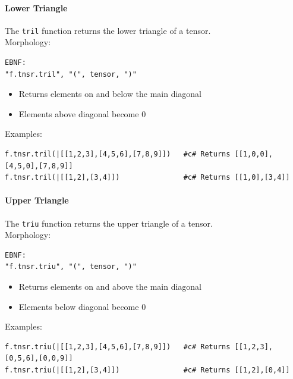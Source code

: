 \paragraph{Lower Triangle}
The \texttt{tril} function returns the lower triangle of a tensor.\\
Morphology:
\begin{verbatim}
EBNF:
"f.tnsr.tril", "(", tensor, ")"
\end{verbatim}
\begin{itemize}
\item Returns elements on and below the main diagonal
\item Elements above diagonal become 0
\end{itemize}
Examples:
\begin{verbatim}
f.tnsr.tril(|[[1,2,3],[4,5,6],[7,8,9]])   #c# Returns [[1,0,0],[4,5,0],[7,8,9]]
f.tnsr.tril(|[[1,2],[3,4]])               #c# Returns [[1,0],[3,4]]
\end{verbatim}

\paragraph{Upper Triangle}
The \texttt{triu} function returns the upper triangle of a tensor.\\
Morphology:
\begin{verbatim}
EBNF:
"f.tnsr.triu", "(", tensor, ")"
\end{verbatim}
\begin{itemize}
\item Returns elements on and above the main diagonal
\item Elements below diagonal become 0
\end{itemize}
Examples:
\begin{verbatim}
f.tnsr.triu(|[[1,2,3],[4,5,6],[7,8,9]])   #c# Returns [[1,2,3],[0,5,6],[0,0,9]]
f.tnsr.triu(|[[1,2],[3,4]])               #c# Returns [[1,2],[0,4]]
\end{verbatim}

